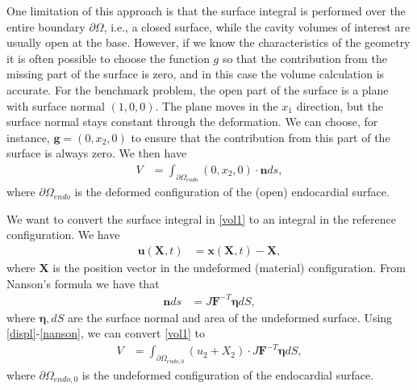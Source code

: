 \documentclass[a4paper,10pt]{article}
\begin{document}
One limitation of this approach is that the surface integral is performed over the
entire boundary $\partial\Omega$, i.e., a closed surface, while the cavity volumes
of interest are usually open at the base. However, if we know the characteristics
of the geometry it is often possible to choose the function $g$ so that the
contribution from the missing part of the surface is zero, and in this case the
volume calculation is accurate. For the benchmark problem, the open
part of the surface is a plane with surface normal $(1,0,0)$. The plane moves
in the $x_1$ direction, but the surface normal stays constant through the
deformation. We can choose, for instance, $\mathbf{g}=(0,x_2,0)$ to ensure that the
contribution from this part of the surface is always zero. We then have
\begin{align}
V &= \int_{\partial\Omega_{endo}}(0,x_2,0) \cdot\mathbf{n}ds ,
\label{vol1}\end{align}
where $\partial\Omega_{endo}$ is the deformed configuration of the (open)
endocardial surface.


We want to convert the surface integral in \eqref{vol1} to an
integral in the reference configuration. We have
\begin{align}
\mathbf{u}(\mathbf{X},t) &= \mathbf{x}(\mathbf{X},t)-\mathbf{X},
\label{displ}\end{align}
where $\mathbf{X}$ is the position vector in the undeformed (material) configuration.
From Nanson's formula we have that
\begin{align}
\mathbf{n}ds &= J\mathbf{F}^{-T}\mathbf{\eta}dS,
\label{nanson}\end{align}
where $\mathbf{\eta}, dS$ are the surface normal and area of the undeformed surface.
Using \eqref{displ}-\eqref{nanson}, we can convert \eqref{vol1} to
\begin{align}
V &=  \int_{\partial\Omega_{endo,0}}(u_2+X_2)\cdot
J\mathbf{F}^{-T}\mathbf{\eta}dS ,
\label{vol2}\end{align}
where $\partial\Omega_{endo,0}$ is the undeformed configuration
of the endocardial surface.
\end{document}
